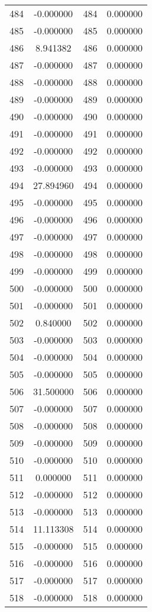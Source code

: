 \documentclass[12pt]{article}
\begin{document}
\begin{longtable}{@{}cccc@{}}
484 & -0.000000 & 484 & 0.000000 \\
485 & -0.000000 & 485 & 0.000000 \\
486 & 8.941382 & 486 & 0.000000 \\
487 & -0.000000 & 487 & 0.000000 \\
488 & -0.000000 & 488 & 0.000000 \\
489 & -0.000000 & 489 & 0.000000 \\
490 & -0.000000 & 490 & 0.000000 \\
491 & -0.000000 & 491 & 0.000000 \\
492 & -0.000000 & 492 & 0.000000 \\
493 & -0.000000 & 493 & 0.000000 \\
494 & 27.894960 & 494 & 0.000000 \\
495 & -0.000000 & 495 & 0.000000 \\
496 & -0.000000 & 496 & 0.000000 \\
497 & -0.000000 & 497 & 0.000000 \\
498 & -0.000000 & 498 & 0.000000 \\
499 & -0.000000 & 499 & 0.000000 \\
500 & -0.000000 & 500 & 0.000000 \\
501 & -0.000000 & 501 & 0.000000 \\
502 & 0.840000 & 502 & 0.000000 \\
503 & -0.000000 & 503 & 0.000000 \\
504 & -0.000000 & 504 & 0.000000 \\
505 & -0.000000 & 505 & 0.000000 \\
506 & 31.500000 & 506 & 0.000000 \\
507 & -0.000000 & 507 & 0.000000 \\
508 & -0.000000 & 508 & 0.000000 \\
509 & -0.000000 & 509 & 0.000000 \\
510 & -0.000000 & 510 & 0.000000 \\
511 & 0.000000 & 511 & 0.000000 \\
512 & -0.000000 & 512 & 0.000000 \\
513 & -0.000000 & 513 & 0.000000 \\
514 & 11.113308 & 514 & 0.000000 \\
515 & -0.000000 & 515 & 0.000000 \\
516 & -0.000000 & 516 & 0.000000 \\
517 & -0.000000 & 517 & 0.000000 \\
518 & -0.000000 & 518 & 0.000000 \\

\end{longtable}
\end{document}
